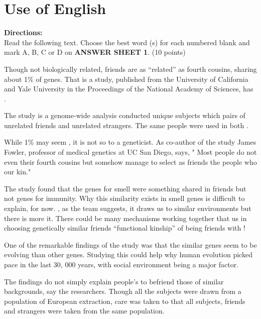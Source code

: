 



\section{Use of English}

\noindent
\textbf{Directions:}\\
{Read the following text. Choose the best word (s) for each
	numbered blank and mark A, B, C or D on \textbf{ANSWER SHEET 1}. (10 points)}


\TiGanSpace


Though not biologically related, friends are as ``related'' as fourth
cousins, sharing about 1\% of genes. That is \cloze a
study, published from the University of California and Yale University in
the Proceedings of the National Academy of Sciences, has \cloze .

The study is a genome-wide analysis conducted  unique
subjects which \cloze pairs of unrelated friends and unrelated
strangers. The same people were used in both \cloze.

While 1\% may seem \cloze , it is not so to a geneticist. As
co-author of the study James Fowler, professor of medical genetics at UC
San Diego, says, " Most people do not even \cloze their fourth
cousins but somehow manage to select as friends the people who
\cloze our kin."

The study \cloze found that the genes for smell were something
shared in friends but not genes for immunity. Why this similarity exists
in smell genes is difficult to explain, for now. \cloze , as the
team suggests, it draws us to similar environments but there is more
\cloze it. There could be many mechanisms working together that
\cloze us in choosing genetically similar friends \cloze
``functional kinship'' of being friends with \cloze !

One of the remarkable findings of the study was that the similar genes
seem to be evolving \cloze than other genes. Studying this could
help \cloze why human evolution picked pace in the last 30, 000
years, with social environment being a major \cloze factor.

The findings do not simply explain people's \cloze to befriend
those of similar \cloze backgrounds, say the researchers. Though
all the subjects were drawn from a population of European extraction,
care was taken to \cloze that all subjects, friends and strangers
were taken from the same population.


